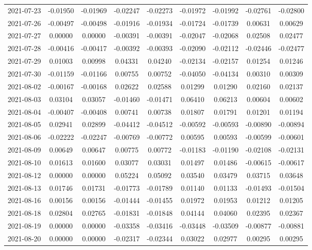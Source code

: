 {\begin{footnotesize}
\begin{longtable}{lcccccccc}
2021-07-23 & -0.01950 & -0.01969 & -0.02247 & -0.02273 & -0.01972 & -0.01992 & -0.02761 & -0.02800 \\
2021-07-26 & -0.00497 & -0.00498 & -0.01916 & -0.01934 & -0.01724 & -0.01739 & 0.00631 & 0.00629 \\
2021-07-27 & 0.00000 & 0.00000 & -0.00391 & -0.00391 & -0.02047 & -0.02068 & 0.02508 & 0.02477 \\
2021-07-28 & -0.00416 & -0.00417 & -0.00392 & -0.00393 & -0.02090 & -0.02112 & -0.02446 & -0.02477 \\
2021-07-29 & 0.01003 & 0.00998 & 0.04331 & 0.04240 & -0.02134 & -0.02157 & 0.01254 & 0.01246 \\
2021-07-30 & -0.01159 & -0.01166 & 0.00755 & 0.00752 & -0.04050 & -0.04134 & 0.00310 & 0.00309 \\
2021-08-02 & -0.00167 & -0.00168 & 0.02622 & 0.02588 & 0.01299 & 0.01290 & 0.02160 & 0.02137 \\
2021-08-03 & 0.03104 & 0.03057 & -0.01460 & -0.01471 & 0.06410 & 0.06213 & 0.00604 & 0.00602 \\
2021-08-04 & -0.00407 & -0.00408 & 0.00741 & 0.00738 & 0.01807 & 0.01791 & 0.01201 & 0.01194 \\
2021-08-05 & 0.02941 & 0.02899 & -0.04412 & -0.04512 & -0.00592 & -0.00593 & -0.00890 & -0.00894 \\
2021-08-06 & -0.02222 & -0.02247 & -0.00769 & -0.00772 & 0.00595 & 0.00593 & -0.00599 & -0.00601 \\
2021-08-09 & 0.00649 & 0.00647 & 0.00775 & 0.00772 & -0.01183 & -0.01190 & -0.02108 & -0.02131 \\
2021-08-10 & 0.01613 & 0.01600 & 0.03077 & 0.03031 & 0.01497 & 0.01486 & -0.00615 & -0.00617 \\
2021-08-12 & 0.00000 & 0.00000 & 0.05224 & 0.05092 & 0.03540 & 0.03479 & 0.03715 & 0.03648 \\
2021-08-13 & 0.01746 & 0.01731 & -0.01773 & -0.01789 & 0.01140 & 0.01133 & -0.01493 & -0.01504 \\
2021-08-16 & 0.00156 & 0.00156 & -0.01444 & -0.01455 & 0.01972 & 0.01953 & 0.01212 & 0.01205 \\
2021-08-18 & 0.02804 & 0.02765 & -0.01831 & -0.01848 & 0.04144 & 0.04060 & 0.02395 & 0.02367 \\
2021-08-19 & 0.00000 & 0.00000 & -0.03358 & -0.03416 & -0.03448 & -0.03509 & -0.00877 & -0.00881 \\
2021-08-20 & 0.00000 & 0.00000 & -0.02317 & -0.02344 & 0.03022 & 0.02977 & 0.00295 & 0.00295 \\

\end{longtable}
\end{footnotesize}}

